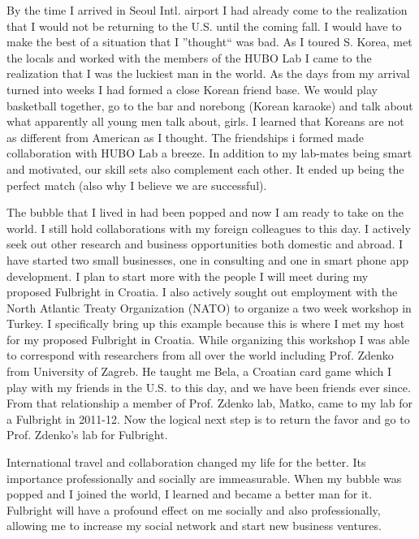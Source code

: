\documentclass[12pt]{article}
\begin{document}
	By the time I arrived in Seoul Intl. airport I had already come to the realization that I would not be returning to the U.S. until the coming fall.  
I would have to make the best of a situation that I ''thought`` was bad.  
As I toured S. Korea, met the locals and worked with the members of the HUBO Lab I came to the realization that I was the luckiest man in the world. 
 As the days from my arrival turned into weeks I had formed a close Korean friend base.
We would play basketball together, go to the bar and norebong (Korean karaoke) and talk about what apparently all young men talk about, girls.  
I learned that Koreans are not as different from American as I thought.
The friendships i formed made collaboration with HUBO Lab a breeze.  
In addition to my lab-mates being smart and motivated, our skill sets also complement each other.  
It ended up being the perfect match (also why I believe we are successful).  

The bubble that I lived in had been popped and now I am ready to take on the world.  
I still hold collaborations with my foreign colleagues to this day.
I actively seek out other research and business opportunities both domestic and abroad.
I have started two small businesses, one in consulting and one in smart phone app development.
I plan to start more with the people I will meet during my proposed Fulbright in Croatia.
I also actively sought out employment with the North Atlantic Treaty Organization (NATO) to organize  a two week workshop in Turkey.    
I specifically bring up this example because this is where I met my host for my proposed Fulbright in Croatia.
While organizing this workshop I was able to correspond with researchers from all over the world including Prof. Zdenko from University of Zagreb.
He taught me Bela, a Croatian card game which I play with my friends in the U.S. to this day, and we have been friends ever since.  
From that relationship a member of Prof. Zdenko lab, Matko, came to my lab for a Fulbright in 2011-12.  
Now the logical next step is to return the favor and go to Prof. Zdenko's lab for Fulbright.


International travel and collaboration changed my life for the better.
Its importance professionally and socially are immeasurable.
When my bubble was popped and I joined the world, I learned and became a better man for it.
Fulbright will have a profound effect on me socially and also professionally, allowing me to increase my social network and start new business ventures. 
\end{document}
